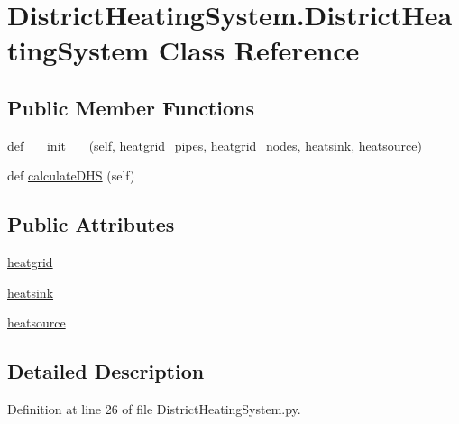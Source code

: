 \hypertarget{class_district_heating_system_1_1_district_heating_system}{}\section{District\+Heating\+System.\+District\+Heating\+System Class Reference}
\label{class_district_heating_system_1_1_district_heating_system}
\subsection*{Public Member Functions}
\begin{DoxyCompactItemize}
\item 
def \hyperlink{class_district_heating_system_1_1_district_heating_system_a46877fb13a3587e2c712079b2f5ff69c}{\+\_\+\+\_\+init\+\_\+\+\_\+} (self, heatgrid\+\_\+pipes, heatgrid\+\_\+nodes, \hyperlink{class_district_heating_system_1_1_district_heating_system_ae2dcd9798aea7a52e1940e4e95aa2d69}{heatsink}, \hyperlink{class_district_heating_system_1_1_district_heating_system_af223b084de1da27241485095b553c119}{heatsource})
\item 
def \hyperlink{class_district_heating_system_1_1_district_heating_system_a881f4f422912c1a2aba56fdf22394ad8}{calculate\+D\+HS} (self)
\end{DoxyCompactItemize}
\subsection*{Public Attributes}
\begin{DoxyCompactItemize}
\item 
\hyperlink{class_district_heating_system_1_1_district_heating_system_a60299959366e5b7bc682e8dc7f2c0aa9}{heatgrid}
\item 
\hyperlink{class_district_heating_system_1_1_district_heating_system_ae2dcd9798aea7a52e1940e4e95aa2d69}{heatsink}
\item 
\hyperlink{class_district_heating_system_1_1_district_heating_system_af223b084de1da27241485095b553c119}{heatsource}
\end{DoxyCompactItemize}


\subsection{Detailed Description}


Definition at line 26 of file District\+Heating\+System.\+py.



